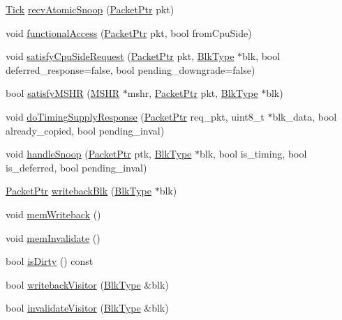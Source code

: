\begin{DoxyCompactItemize}
\item 
\hyperlink{base_2types_8hh_a5c8ed81b7d238c9083e1037ba6d61643}{Tick} \hyperlink{classCache_a886d584c81ee4e398ff8069907f6e1a5}{recvAtomicSnoop} (\hyperlink{classPacket}{PacketPtr} pkt)
\item 
void \hyperlink{classCache_ae764e8af8ed82d5b1e78530e56a16470}{functionalAccess} (\hyperlink{classPacket}{PacketPtr} pkt, bool fromCpuSide)
\item 
void \hyperlink{classCache_a5d5d5944479d29a7bfc183f4b2b6a4fa}{satisfyCpuSideRequest} (\hyperlink{classPacket}{PacketPtr} pkt, \hyperlink{classCache_a10db52a1c10bfd238e0e3d37c4560495}{BlkType} $\ast$blk, bool deferred\_\-response=false, bool pending\_\-downgrade=false)
\item 
bool \hyperlink{classCache_a65c1c67b81573ca17c8ad40e0e6d85d8}{satisfyMSHR} (\hyperlink{classMSHR}{MSHR} $\ast$mshr, \hyperlink{classPacket}{PacketPtr} pkt, \hyperlink{classCache_a10db52a1c10bfd238e0e3d37c4560495}{BlkType} $\ast$blk)
\item 
void \hyperlink{classCache_a87256886a1eea4638abe1b437f4fe226}{doTimingSupplyResponse} (\hyperlink{classPacket}{PacketPtr} req\_\-pkt, uint8\_\-t $\ast$blk\_\-data, bool already\_\-copied, bool pending\_\-inval)
\item 
void \hyperlink{classCache_affa22df454ca8619381018b222c49c2d}{handleSnoop} (\hyperlink{classPacket}{PacketPtr} ptk, \hyperlink{classCache_a10db52a1c10bfd238e0e3d37c4560495}{BlkType} $\ast$blk, bool is\_\-timing, bool is\_\-deferred, bool pending\_\-inval)
\item 
\hyperlink{classPacket}{PacketPtr} \hyperlink{classCache_a4451141787cceb771eec3ea4d4a4a8d4}{writebackBlk} (\hyperlink{classCache_a10db52a1c10bfd238e0e3d37c4560495}{BlkType} $\ast$blk)
\item 
void \hyperlink{classCache_a381272ae5c2cc173adb59cd67a76b458}{memWriteback} ()
\item 
void \hyperlink{classCache_afea64b0aa579c17485db54c6a5c2ede3}{memInvalidate} ()
\item 
bool \hyperlink{classCache_ad66f409af3c387e166ff7ee95169b7b6}{isDirty} () const 
\item 
bool \hyperlink{classCache_a0f9ea802ec68e58830a83fdf795a9b9f}{writebackVisitor} (\hyperlink{classCache_a10db52a1c10bfd238e0e3d37c4560495}{BlkType} \&blk)
\item 
bool \hyperlink{classCache_a0a830cf4879a74de1790653f861c7d93}{invalidateVisitor} (\hyperlink{classCache_a10db52a1c10bfd238e0e3d37c4560495}{BlkType} \&blk)
\item 

\end{DoxyCompactItemize}
